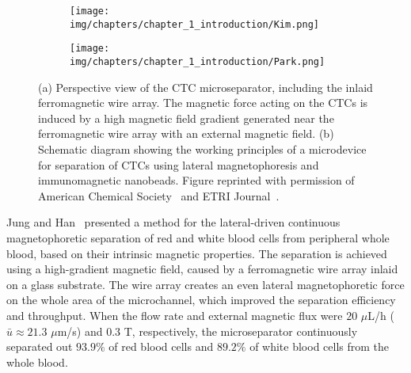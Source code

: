 \begin{figure}[htb!]
        \centering
        \begin{subfigure}[b]{0.8\textwidth}
                \texttt{[image: img/chapters/chapter\_1\_introduction/Kim.png]}
                \caption{}    
                \label{fig:Kim2013}
        \end{subfigure}
        \begin{subfigure}[b]{0.8\textwidth}
                \texttt{[image: img/chapters/chapter\_1\_introduction/Park.png]}
                \caption{}    
                \label{fig:Park2015}
        \end{subfigure}
        \caption[Lateral magnetophoresis microseparators]{(a) Perspective view of the CTC microseparator, including the inlaid ferromagnetic wire array. The magnetic force acting on the CTCs is induced by a high magnetic field gradient generated near the ferromagnetic wire array with an external magnetic field. (b) Schematic diagram showing the working principles of a microdevice for separation of CTCs using lateral magnetophoresis and immunomagnetic nanobeads. Figure reprinted with permission of American Chemical Society~\cite{Kim2013} and ETRI Journal~\cite{Park2015}.}
        \label{fig:ferromagneticWireIntegratedMagnetophoresis}
\end{figure}

Jung and Han~\cite{Jung2008} presented a method for the lateral-driven continuous magnetophoretic separation of red and white blood cells from peripheral whole blood, based on their intrinsic magnetic properties. The separation is achieved using a high-gradient magnetic field, caused by a ferromagnetic wire array inlaid on a glass substrate. The wire array creates an even lateral magnetophoretic force on the whole area of the microchannel, which improved the separation efficiency and throughput. When the flow rate and external magnetic flux were $20$ $\mu$L/h ($\bar{u}\approx 21.3$ $\mu$m/s) and $0.3$ T, respectively, the microseparator continuously separated out $93.9\%$ of red blood cells and $89.2\%$ of white blood cells from the whole blood.

